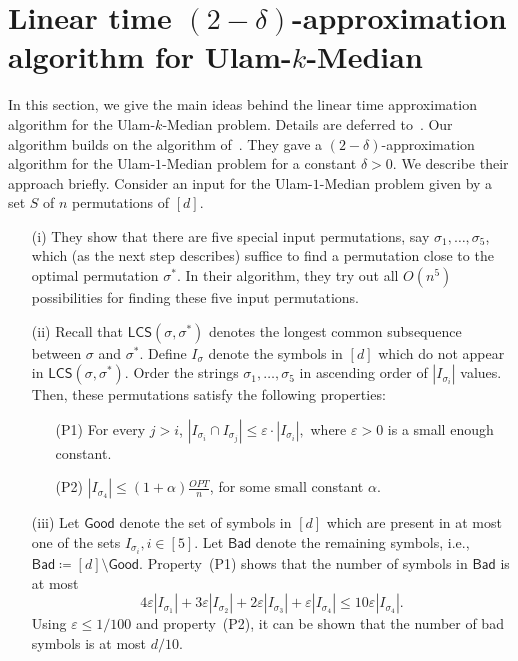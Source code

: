 \documentclass[11pt]{llncs}
\newcommand{\veps}{\varepsilon}
\newcommand{\LCS}{{\textsf{LCS}}}
\begin{document}
\section{Linear time $(2-\delta)$-approximation algorithm for Ulam-$k$-Median}
\label{sec:ulamoutline}
\newcommand{\Bad}{{\mathsf{Bad}}}
\newcommand{\Good}{{\mathsf{Good}}}
In this section, we give the main ideas behind the linear time approximation algorithm for the Ulam-$k$-Median problem. Details are deferred to~. Our algorithm builds on the algorithm of~\cite{cdk23}. 
They gave a $(2-\delta)$-approximation algorithm for the Ulam-$1$-Median problem for a constant $\delta > 0$. 
We describe their approach briefly. Consider an input for the Ulam-$1$-Median problem given by a set $S$ of $n$ permutations of $[d]$. 
\begin{itemize}
\item[(i)] They show that there are five special input permutations, say $\sigma_1, \ldots, \sigma_5$, which (as the next step describes) suffice to find a permutation close to the optimal permutation $\sigma^*$. In their algorithm, they try out all $O(n^5)$ possibilities for finding these five input permutations. 
\item[(ii)] Recall that $\LCS(\sigma, \sigma^*)$ denotes the longest common subsequence between $\sigma$ and $\sigma^*$. Define $I_\sigma$ denote the symbols in $[d]$ which do not appear in $\LCS(\sigma, \sigma^*)$. Order the strings $\sigma_1, \ldots, \sigma_5$ in ascending order of $|I_{\sigma_i}|$ values. Then, these permutations satisfy the following properties: 
\begin{itemize}
    \item[(P1)] For every $j > i$, $|I_{\sigma_i} \cap I_{\sigma_j}| \leq \varepsilon \cdot |I_{\sigma_i}|,$ where $\varepsilon > 0$ is a small enough constant. 
    \item[(P2)] $|I_{\sigma_4}| \leq (1+\alpha)\frac{OPT}{n}$, for some small constant $\alpha$.
\end{itemize}
\item[(iii)] Let $\Good$ denote the set of symbols in $[d]$ which are present in at most one of the sets $I_{\sigma_i}, i \in [5]$. Let $\Bad$ denote the remaining symbols, i.e., $\Bad \coloneqq [d] \setminus \Good.$  Property~(P1) shows that the number of symbols in $\Bad$ is at most 
$$
 4 \veps |I_{\sigma_1}| + 3 \veps |I_{\sigma_2}| + 2 \veps |I_{\sigma_3}| + \veps |I_{\sigma_4}| \leq 10 \veps |I_{\sigma_4}|.
$$
Using $\veps \leq 1/100$ and property~(P2), it can be shown that the number of bad symbols is at most $d/10$.

\end{itemize}
\end{document}

